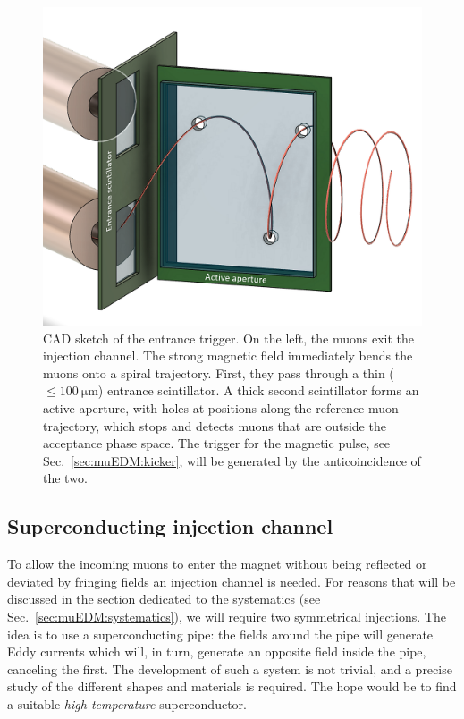 \begin{refsection}
        \begin{figure}
        \centering
            \includegraphics[width=0.35\linewidth]{Figures/muEDM/MuonEntranceTriggerCAD.png}
            \caption[muEDM: CAD design of the entrance detector]{CAD sketch of the entrance trigger. On the left, the muons exit the injection channel. The strong magnetic field immediately bends the muons onto a spiral trajectory. First, they pass through a thin ($\leq\SI{100}{\micro\meter}$) entrance scintillator. A thick second scintillator forms an active aperture, with holes at positions along the reference muon trajectory, which stops and detects muons that are outside the acceptance phase space. The trigger for the magnetic pulse, see Sec.~\ref{sec:muEDM:kicker}, will be generated by the anticoincidence of the two.}
        \label{fig:MuonEntranceTriggerCAD}
        \end{figure}

    \subsection{Superconducting injection channel}
    \label{sec:muEDM:injection}
        To allow the incoming muons to enter the magnet without being reflected or deviated by fringing fields an injection channel is needed.
        For reasons that will be discussed in the section dedicated to the systematics (see Sec.~\ref{sec:muEDM:systematics}), we will require two symmetrical injections.
        The idea is to use a superconducting pipe: the fields around the pipe will generate Eddy currents which will, in turn, generate an opposite field inside the pipe, canceling the first.
        The development of such a system is not trivial, and a precise study of the different shapes and materials is required. 
        The hope would be to find a suitable \textit{high-temperature} superconductor.


\end{refsection}
